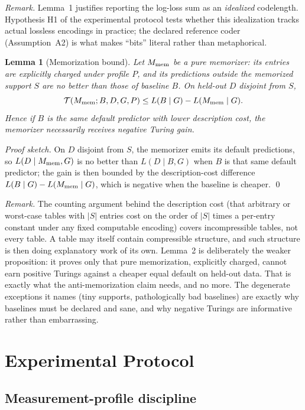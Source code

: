 \documentclass[11pt]{article}
\newtheorem{lemma}{Lemma}
\begin{document}
\textit{Remark.} Lemma~1 justifies reporting the log-loss sum as an \textit{idealized} codelength. Hypothesis H1 of the experimental protocol tests whether this idealization tracks actual lossless encodings in practice; the declared reference coder (Assumption~A2) is what makes ``bits'' literal rather than metaphorical.

\begin{lemma}[Memorization bound]
Let \(M_{\rm mem}\) be a pure memorizer: its entries are explicitly charged under profile \(P\), and its predictions outside the memorized support \(S\) are no better than those of baseline \(B\). On held-out \(D\) disjoint from \(S\),
\[
\mathcal{T}(M_{\rm mem};B,D,G,P) \leq L(B\mid G)-L(M_{\rm mem}\mid G).
\]
Hence if \(B\) is the same default predictor with lower description cost, the memorizer necessarily receives negative Turing gain.
\end{lemma}
\textit{Proof sketch.} On \(D\) disjoint from \(S\), the memorizer emits its default predictions, so \(L(D\mid M_{\rm mem},G)\) is no better than \(L(D\mid B,G)\) when \(B\) is that same default predictor; the gain is then bounded by the description-cost difference \(L(B\mid G)-L(M_{\rm mem}\mid G)\), which is negative when the baseline is cheaper. \qed

\textit{Remark.} The counting argument behind the description cost (that arbitrary or worst-case tables with \(|S|\) entries cost on the order of \(|S|\) times a per-entry constant under any fixed computable encoding) covers incompressible tables, not every table. A table may itself contain compressible structure, and such structure is then doing explanatory work of its own. Lemma~2 is deliberately the weaker proposition: it proves only that pure memorization, explicitly charged, cannot earn positive Turings against a cheaper equal default on held-out data. That is exactly what the anti-memorization claim needs, and no more. The degenerate exceptions it names (tiny supports, pathologically bad baselines) are exactly why baselines must be declared and sane, and why negative Turings are informative rather than embarrassing.

\section{Experimental Protocol}

\subsection{Measurement-profile discipline}
\end{document}

